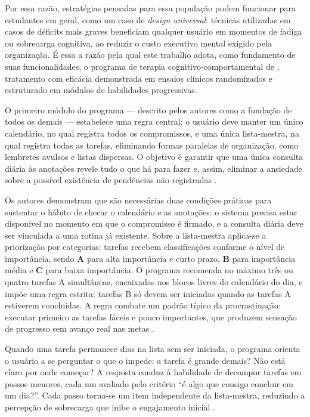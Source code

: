 \documentclass[12pt, %
openright, 
oneside,
a4paper,
english,   %
brazil]{facom-ufu-abntex2}
\begin{document}
Por essa razão, estratégias pensadas para essa população podem funcionar para
estudantes em geral, como um caso de \textit{design universal}: técnicas
utilizadas em casos de déficits mais graves beneficiam qualquer usuário em
momentos de fadiga ou sobrecarga cognitiva, ao reduzir o custo executivo
mental exigido pela organização. É essa a razão pela qual este trabalho adota,
como fundamento de suas funcionalidades, o programa de terapia
cognitivo-comportamental de ,
tratamento com eficácia demonstrada em ensaios clínicos randomizados e
estruturado em módulos de habilidades progressivas.

O primeiro módulo do programa --- descrito pelos autores como a fundação de
todos os demais --- estabelece uma regra central: o usuário deve manter um
único calendário, no qual registra todos os compromissos, e uma única
lista-mestra, na qual registra todas as tarefas, eliminando formas paralelas
de organização, como lembretes avulsos e listas dispersas. O objetivo é
garantir que uma única consulta diária às anotações revele tudo o que há para
fazer e, assim, eliminar a ansiedade sobre a possível existência de pendências
não registradas \cite{SafrenMasteringADHD}.

Os autores demonstram que são necessárias duas condições práticas para
sustentar o hábito de checar o calendário e as anotações: o sistema precisa
estar disponível no momento em que o compromisso é firmado, e a consulta
diária deve ser vinculada a uma rotina já existente. Sobre a lista-mestra
aplica-se a priorização por categorias: tarefas recebem classificações
conforme o nível de importância, sendo \textbf{A} para alta importância e
curto prazo, \textbf{B} para importância média e \textbf{C} para baixa
importância. O programa recomenda no máximo três ou quatro tarefas A
simultâneas, encaixadas nos blocos livres do calendário do dia, e impõe uma
regra estrita: tarefas B só devem ser iniciadas quando as tarefas A estiverem
concluídas. A regra combate um padrão típico da procrastinação: executar
primeiro as tarefas fáceis e pouco importantes, que produzem sensação de
progresso sem avanço real nas metas \cite{SafrenMasteringADHD}.

Quando uma tarefa permanece dias na lista sem ser iniciada, o programa orienta
o usuário a se perguntar o que o impede: a tarefa é grande demais? Não está
claro por onde começar? A resposta conduz à habilidade de decompor tarefas em
passos menores, cada um avaliado pelo critério ``é algo que consigo concluir
em um dia?''. Cada passo torna-se um item independente da lista-mestra,
reduzindo a percepção de sobrecarga que inibe o engajamento inicial
\cite{SafrenMasteringADHD}.
\end{document}
